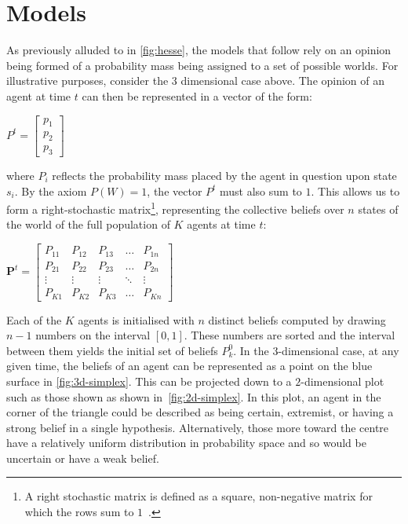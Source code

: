 \section{Models}\label{sect:method}

As previously alluded to in \cref{fig:hesse}, the models that follow rely on an opinion being formed of a probability mass being assigned to a set of possible worlds. For illustrative purposes, consider the $3$ dimensional case above. The opinion of an agent at time $t$ can then be represented in a vector of the form:

\begin{center}
$P^t = \begin{bmatrix}
    p_{1}\\
    p_{2}\\
    p_{3}
\end{bmatrix}$
\end{center}

where $P_i$ reflects the probability mass placed by the agent in question upon state $s_i$. By the axiom $P(W) = 1$, the vector $P^t$ must also sum to $1$. This allows us to form a right-stochastic matrix\footnote{A right stochastic matrix is defined as a square, non-negative matrix for which the rows sum to $1$~\cite{Gagniuc2017MarkovExperimentation}.}, representing the collective beliefs over $n$ states of the world of the full population of $K$ agents at time $t$:

\begin{center}
$\mathbf{P}^t = \begin{bmatrix}
    P_{11} & P_{12} & P_{13} & \dots  & P_{1n} \\
    P_{21} & P_{22} & P_{23} & \dots  & P_{2n} \\
    \vdots & \vdots & \vdots & \ddots & \vdots \\
    P_{K1} & P_{K2} & P_{K3} & \dots  & P_{Kn}
\end{bmatrix}$
\end{center}

Each of the $K$ agents is initialised with $n$ distinct beliefs computed by drawing $n-1$ numbers on the interval $ [ 0,1 ] $. These numbers are sorted and the interval between them yields the initial set of beliefs $P_{k}^0$. In the $3$-dimensional case, at any given time, the beliefs of an agent can be represented as a point on the blue surface in \cref{fig:3d-simplex}. This can be projected down to a $2$-dimensional plot such as those shown as shown in~\cref{fig:2d-simplex}.  In this plot, an agent in the corner of the triangle could be described as being certain, extremist, or having a strong belief in a single hypothesis. Alternatively, those more toward the centre have a relatively uniform distribution in probability space and so would be uncertain or have a weak belief.  

